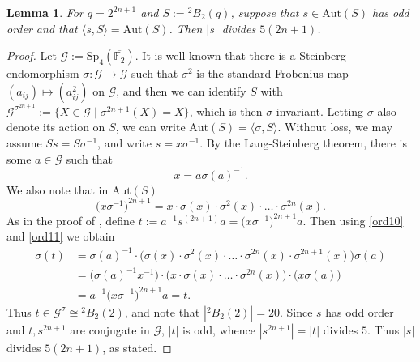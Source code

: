 \documentclass[11pt]{amsart}
\theoremstyle{plain}
\newtheorem{lem}[thm]{Lemma}
\theoremstyle{definition}
\numberwithin{thm}{section}
\numberwithin{equation}{thm}
\newcommand{\Aut}{\mathrm{Aut}}
\newcommand{\Sp}{\mathrm{Sp}}
\newcommand{\sG}{{\mathcal G}}
\newcommand{\F}{{\mathbb F}}
\newcommand{\0}{\emptyset}
\newcommand{\tw}[1]{{}^#1\!}
\begin{document}
\begin{lem}\label{order}
For $q=2^{2n+1}$ and $S := \tw2 B_2(q)$, suppose that $s \in \Aut(S)$ has odd order and that 
$\langle s,S \rangle = \Aut(S)$. Then $|s|$ divides $5(2n+1)$. 
\end{lem}

\begin{proof}
Let $\sG := \Sp_4(\overline{\F_2})$. It is well known that there is a Steinberg endomorphism $\sigma: \sG \to \sG$ such that 
$\sigma^2$ is the standard Frobenius map $(a_{ij}) \mapsto (a_{ij}^2)$ on $\sG$, and then we can identify $S$ with 
$\sG^{\sigma^{2n+1}} := \{ X \in \sG \mid \sigma^{2n+1}(X) = X \}$, which is then $\sigma$-invariant. Letting $\sigma$ also denote its
action on $S$, we can write $\Aut(S) = \langle \sigma,S \rangle$. Without loss, we may assume $Ss = S\sigma^{-1}$, and write
$s=x\sigma^{-1}$. By the Lang-Steinberg theorem, there is some $a \in \sG$ such that 
\begin{equation}\label{ord10}
  x=a\sigma(a)^{-1}.
\end{equation}
We also note that in $\Aut(S)$ 
\begin{equation}\label{ord11}
  \bigl(x\sigma^{-1}\bigr)^{2n+1} = x\cdot\sigma(x)\cdot \sigma^2(x) \cdot \ldots \cdot \sigma^{2n}(x).
\end{equation}  
As in the proof of \cite[Theorem 2.16]{GMPS}, define $t:=a^{-1}s^{(2n+1)}a=\bigl(x\sigma^{-1}\bigr)^{2n+1}a$. 
Then using \eqref{ord10} and 
\eqref{ord11} we obtain
$$\begin{aligned}\sigma(t) & =\sigma(a)^{-1} \cdot \bigl( \sigma(x)\cdot\sigma^2(x)\cdot \ldots \cdot \sigma^{2n}(x)\cdot\sigma^{2n+1}(x)
     \bigr) \sigma(a)\\ 
     & = \bigl(\sigma(a)^{-1}x^{-1}\bigr) \cdot \bigl( x\cdot\sigma(x) \cdot \ldots \cdot \sigma^{2n}(x) \bigr) \cdot \bigl(x\sigma(a))\\
     & = a^{-1}\bigl(x\sigma^{-1}\bigr)^{2n+1}a = t.\end{aligned}$$ 
Thus $t \in \sG^\sigma \cong \tw2 B_2(2)$, and note that $|\tw2 B_2(2)| = 20$. Since $s$ has odd order and $t,s^{2n+1}$ are conjugate
in $\sG$, $|t|$ is odd, whence $|s^{2n+1}| = |t|$ divides $5$. Thus $|s|$ divides $5(2n+1)$, as stated.
\end{proof}
\end{document}
